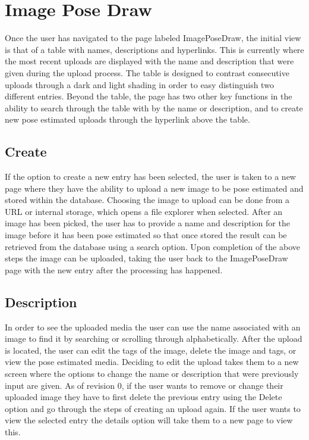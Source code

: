 \documentclass{scrreprt}
\begin{document}
\section{Image Pose Draw}
Once the user has navigated to the page labeled ImagePoseDraw, the initial view is that of a table with names, descriptions and hyperlinks. This is currently where the most recent uploads are displayed with the name and description that were given during the upload process. The table is designed to contrast consecutive uploads through a dark and light shading in order to easy distinguish two different entries. Beyond the table, the page has two other key functions in the ability to search through the table with by the name or description, and to create new pose estimated uploads through the hyperlink above the table.

\subsection{Create}
If the option to create a new entry has been selected, the user is taken to a new page where they have the ability to upload a new image to be pose estimated and stored within the database. Choosing the image to upload can be done from a URL or internal storage, which opens a file explorer when selected. After an image has been picked, the user has to provide a name and description for the image before it has been pose estimated so that once stored the result can be retrieved from the database using a search option. Upon completion of the above steps the image can be uploaded, taking the user back to the ImagePoseDraw page with the new entry after the processing has happened.

\subsection{Description}
In order to see the uploaded media the user can use the name associated with an image to find it by searching or scrolling through alphabetically. After the upload is located, the user can edit the tags of the image, delete the image and tags, or view the pose estimated media. Deciding to edit the upload takes them to a new screen where the options to change the name or description that were previously input are given. As of revision 0, if the user wants to remove or change their uploaded image they have to first delete the previous entry using the Delete option and go through the steps of creating an upload again. If the user wants to view the selected entry the details option will take them to a new page to view this.
\end{document}
